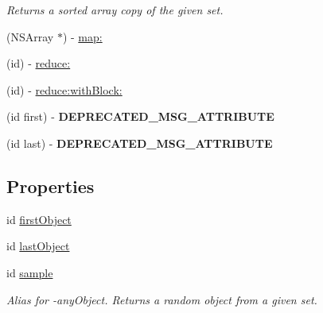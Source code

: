 \begin{DoxyCompactItemize}
\begin{DoxyCompactList}\small\item\em Returns a sorted array copy of the given set. \end{DoxyCompactList}\item 
(N\+S\+Array $\ast$) -\/ \hyperlink{category_n_s_set_07_accessors_08_ae0c7b9a26664c42024b08a4d6bf4783b}{map\+:}
\item 
(id) -\/ \hyperlink{category_n_s_set_07_accessors_08_aaeb944b12a976f99ffc322ee404cbc49}{reduce\+:}
\item 
(id) -\/ \hyperlink{category_n_s_set_07_accessors_08_a3b575ccf25f6a9a11155284dbe7d3363}{reduce\+:with\+Block\+:}
\item 
\hypertarget{category_n_s_set_07_accessors_08_a32525840e0e64c60589d2ec125166ac2}{}(id first) -\/ {\bfseries D\+E\+P\+R\+E\+C\+A\+T\+E\+D\+\_\+\+M\+S\+G\+\_\+\+A\+T\+T\+R\+I\+B\+U\+T\+E}\label{category_n_s_set_07_accessors_08_a32525840e0e64c60589d2ec125166ac2}

\item 
\hypertarget{category_n_s_set_07_accessors_08_aa27de139f5142b053d06071d0cca0125}{}(id last) -\/ {\bfseries D\+E\+P\+R\+E\+C\+A\+T\+E\+D\+\_\+\+M\+S\+G\+\_\+\+A\+T\+T\+R\+I\+B\+U\+T\+E}\label{category_n_s_set_07_accessors_08_aa27de139f5142b053d06071d0cca0125}

\end{DoxyCompactItemize}
\subsection*{Properties}
\begin{DoxyCompactItemize}
\item 
id \hyperlink{category_n_s_set_07_accessors_08_ad03630410210996ef237cea9027e4ae4}{first\+Object}
\item 
id \hyperlink{category_n_s_set_07_accessors_08_a6429f547e10c578daceaf3de21cf839b}{last\+Object}
\item 
\hypertarget{category_n_s_set_07_accessors_08_a6449f017f40cd9a1e241c1769dfcb72e}{}id \hyperlink{category_n_s_set_07_accessors_08_a6449f017f40cd9a1e241c1769dfcb72e}{sample}\label{category_n_s_set_07_accessors_08_a6449f017f40cd9a1e241c1769dfcb72e}

\begin{DoxyCompactList}\small\item\em Alias for -\/any\+Object. Returns a random object from a given set. \end{DoxyCompactList}\end{DoxyCompactItemize}


